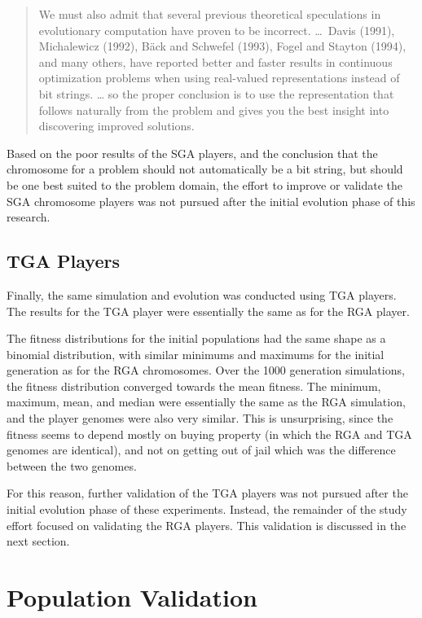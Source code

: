 \begin{quote}
We must also admit that several previous theoretical speculations in
evolutionary computation have proven to be incorrect. \ldots~Davis (1991),
Michalewicz (1992), B\"ack and Schwefel (1993), Fogel and Stayton (1994), and
many others, have reported better and faster results in continuous optimization
problems when using real-valued representations instead of bit strings. \ldots
so the proper conclusion is to use the representation that follows naturally
from the problem and gives you the best insight into discovering improved
solutions.
\end{quote}

Based on the poor results of the SGA players, and the conclusion that the
chromosome for a problem should not automatically be a bit string, but should be
one best suited to the problem domain, the effort to improve or validate the SGA
chromosome players was not pursued after the initial evolution phase of this
research.

\subsection{TGA Players} \label{6_TGS}

Finally, the same simulation and evolution was conducted using TGA players. The
results for the TGA player were essentially the same as for the RGA player.

The fitness distributions for the initial populations had the same shape as a
binomial distribution, with similar minimums and maximums for the initial
generation as for the RGA chromosomes. Over the 1000 generation simulations, the
fitness distribution converged towards the mean fitness. The minimum, maximum,
mean, and median were essentially the same as the RGA simulation, and the player
genomes were also very similar. This is unsurprising, since the fitness seems to
depend mostly on buying property (in which the RGA and TGA genomes are
identical), and not on getting out of jail which was the difference between the
two genomes.

For this reason, further validation of the TGA players was not pursued after
the initial evolution phase of these experiments. Instead, the remainder of the
study effort focused on validating the RGA players. This validation is discussed
in the next section.

\section{Population Validation} \label{6_Validation}

